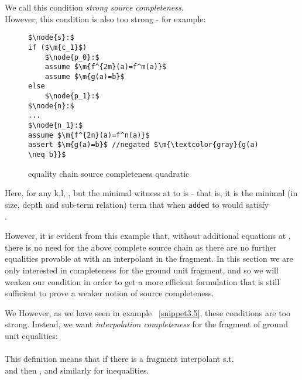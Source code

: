 We call this condition \emph{strong source completeness}.\\
However, this condition is also too strong - for example:
\begin{figure}[H]
\begin{lstlisting}
$\node{s}:$
if ($\m{c_1}$)
	$\node{p_0}:$
	assume $\m{f^{2m}(a)=f^m(a)}$
	assume $\m{g(a)=b}$
else
	$\node{p_1}:$
$\node{n}:$
...
$\node{n_1}:$
assume $\m{f^{2n}(a)=f^n(a)}$
assert $\m{g(a)=b}$ //negated $\m{\textcolor{gray}{g(a) \neq b}}$
\end{lstlisting}
\caption{equality chain source completeness quadratic}
\label{snippet3.16d}
\end{figure}
Here, for any k,l, , but the minimal witness at  to  is  - that is, it is the minimal (in size, depth and sub-term relation) term  that when \lstinline{added} to  would satisfy \\
.

However, it is evident from this example that, without additional equations at , there is no need for the above complete source chain as there are no further equalities provable at  with an interpolant in the fragment.
In this section we are only interested in completeness for the ground unit fragment, and so we will weaken our condition in order to get a more efficient formulation that is still sufficient to prove a weaker notion of source completeness.





\bigskip
\noindent
We 
However, as we have seen in example ~\ref{snippet3.5}, these conditions are too strong.
Instead, we want \emph{interpolation completeness} for the fragment of ground unit equalities:\\
\\
This definition means that if there is a fragment interpolant  s.t.  \\
and  then , and similarly for inequalities.

